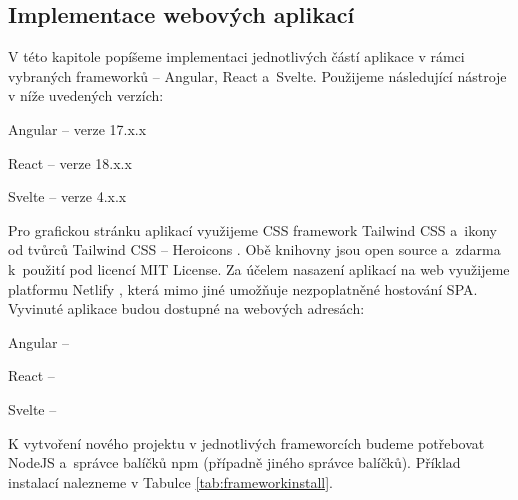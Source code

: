 \subsection{Implementace webových aplikací}

V této kapitole popíšeme implementaci jednotlivých částí aplikace v rámci vybraných frameworků -- Angular, React a~Svelte. Použijeme následující nástroje v níže uvedených verzích:

\begin{citemize}
	\item Angular -- verze 17.x.x
	\item React -- verze 18.x.x
	\item Svelte -- verze 4.x.x
\end{citemize}

Pro grafickou stránku aplikací využijeme CSS framework Tailwind CSS \cite{tailwindcssframework} a~ikony od tvůrců Tailwind CSS -- Heroicons \cite{heroiconslib}. 
Obě knihovny jsou open source a~zdarma k~použití pod licencí MIT License. 
Za účelem nasazení aplikací na web využijeme platformu Netlify \cite{netlifyplatform}, která mimo jiné umožňuje nezpoplatněné hostování SPA. 
Vyvinuté aplikace budou dostupné na webových adresách:

\begin{citemize}
	\item Angular -- 
	\item React -- 
	\item Svelte -- 
\end{citemize}

K vytvoření nového projektu v jednotlivých frameworcích budeme potřebovat NodeJS a~správce balíčků npm (případně jiného správce balíčků). 
Příklad instalací nalezneme v Tabulce \ref{tab:frameworkinstall}.

